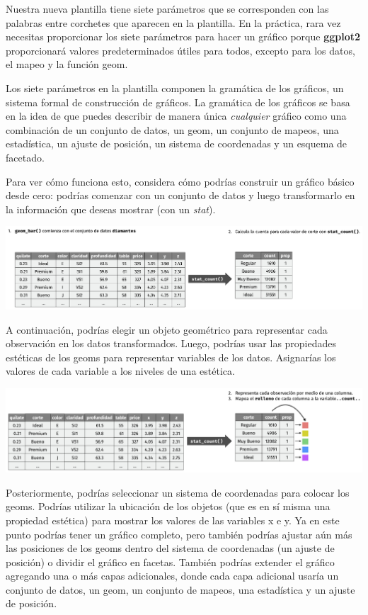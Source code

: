 \documentclass[11pt,oneside]{report}
\begin{document}
Nuestra nueva plantilla tiene siete parámetros que se corresponden con
las palabras entre corchetes que aparecen en la plantilla. En la
práctica, rara vez necesitas proporcionar los siete parámetros para
hacer un gráfico porque \textbf{ggplot2} proporcionará valores
predeterminados útiles para todos, excepto para los datos, el mapeo y la
función geom.

Los siete parámetros en la plantilla componen la gramática de los
gráficos, un sistema formal de construcción de gráficos. La gramática de
los gráficos se basa en la idea de que puedes describir de manera única
\emph{cualquier} gráfico como una combinación de un conjunto de datos,
un geom, un conjunto de mapeos, una estadística, un ajuste de posición,
un sistema de coordenadas y un esquema de facetado.

Para ver cómo funciona esto, considera cómo podrías construir un gráfico
básico desde cero: podrías comenzar con un conjunto de datos y luego
transformarlo en la información que deseas mostrar (con un \emph{stat}).

\begin{center}\includegraphics[width=1\linewidth]{diagrams_pdf/es/visualization-grammar-1} \end{center}

A continuación, podrías elegir un objeto geométrico para representar
cada observación en los datos transformados. Luego, podrías usar las
propiedades estéticas de los geoms para representar variables de los
datos. Asignarías los valores de cada variable a los niveles de una
estética.

\begin{center}\includegraphics[width=1\linewidth]{diagrams_pdf/es/visualization-grammar-2} \end{center}

Posteriormente, podrías seleccionar un sistema de coordenadas para
colocar los geoms. Podrías utilizar la ubicación de los objetos (que es
en sí misma una propiedad estética) para mostrar los valores de las
variables x e y. Ya en este punto podrías tener un gráfico completo,
pero también podrías ajustar aún más las posiciones de los geoms dentro
del sistema de coordenadas (un ajuste de posición) o dividir el gráfico
en facetas. También podrías extender el gráfico agregando una o más
capas adicionales, donde cada capa adicional usaría un conjunto de
datos, un geom, un conjunto de mapeos, una estadística y un ajuste de
posición.
\end{document}
